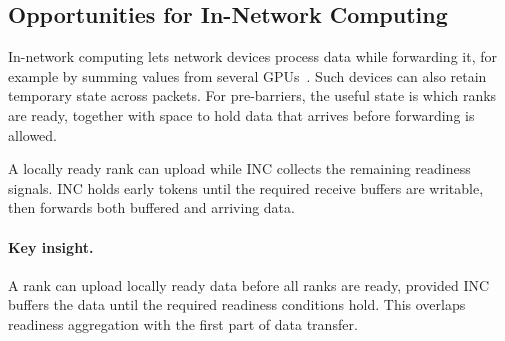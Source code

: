 \subsection{Opportunities for In-Network Computing}
\label{sec:incopportunity}
In-network computing lets network devices process data while forwarding it, for example by summing values from several GPUs~\cite{sharp,switchml,dysharp}. Such devices can also retain temporary state across packets. For pre-barriers, the useful state is which ranks are ready, together with space to hold data that arrives before forwarding is allowed.

A locally ready rank can upload while INC collects the remaining readiness signals. INC holds early tokens until the required receive buffers are writable, then forwards both buffered and arriving data.

\paragraph{Key insight.}
A rank can upload locally ready data before all ranks are ready, provided INC buffers the data until the required readiness conditions hold. This overlaps readiness aggregation with the first part of data transfer.
